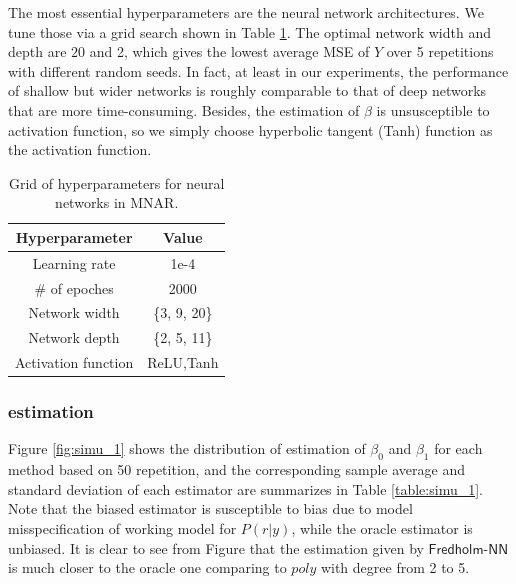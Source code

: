 \documentclass[11pt]{article}
\def\fred{\mathsf{Fredholm\mbox{-}NN}}
\begin{document}
The most essential hyperparameters are the neural network architectures. We tune those via a grid search shown in Table \ref{table:hyparam of 1}. The optimal network width and depth are $20$ and 2, which gives the lowest average MSE of $Y$ over 5 repetitions with different random seeds. In fact, at least in our experiments, the performance of shallow but wider networks is roughly comparable to that of deep networks that are more time-consuming. Besides, the estimation of $\beta$ is unsusceptible to activation function, so we simply choose hyperbolic tangent (Tanh) function
as the activation function.

\begin{table}[h]
\caption{Grid of hyperparameters for neural networks in MNAR.}
\label{table:hyparam of 1}
\begin{center}
\vspace{0.3cm}
\begin{tabular}{cc}
\hline
Hyperparameter    & Value                       \\ \hline
Learning rate     & 1e-4                    \\
\# of epoches     & 2000                       \\
Network width     & \{3, 9, 20\} \\
Network depth     & \{2, 5, 11\}                \\
Activation function & ReLU,Tanh \\
\hline
\end{tabular}
\end{center}
\end{table}

\subsubsection{estimation}



Figure \ref{fig:simu_1} shows the distribution of estimation of $\beta_0$ and $\beta_1$ for each method based on 50 repetition, and the corresponding sample average and standard deviation of each estimator are summarizes in Table \ref{table:simu_1}. Note that the biased estimator is susceptible to bias due to model misspecification of working model for $P(r|y)$, while the oracle estimator is unbiased. It is clear to see from Figure that the estimation given by $\fred$ is much closer to the oracle one comparing to $poly$ with degree from 2 to 5. 
\end{document}

